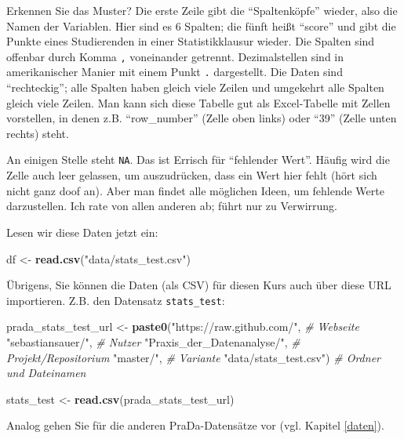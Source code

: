 \documentclass[12pt,ngerman,]{book}
\makeatletter
\newenvironment{Shaded}{\begin{snugshade}}{\end{snugshade}}
\newcommand{\KeywordTok}[1]{\textcolor[rgb]{0.13,0.29,0.53}{\textbf{#1}}}
\newcommand{\StringTok}[1]{\textcolor[rgb]{0.31,0.60,0.02}{#1}}
\newcommand{\CommentTok}[1]{\textcolor[rgb]{0.56,0.35,0.01}{\textit{#1}}}
\newcommand{\NormalTok}[1]{#1}
\newenvironment{kframe}{%
\medskip{}
\setlength{\fboxsep}{.8em}
 \def\at@end@of@kframe{}%
 \ifinner\ifhmode%
  \def\at@end@of@kframe{\end{minipage}}%
  \begin{minipage}{\columnwidth}%
 \fi\fi%
 \def\FrameCommand##1{\hskip\@totalleftmargin \hskip-\fboxsep
 \colorbox{shadecolor}{##1}\hskip-\fboxsep
     \hskip-\linewidth \hskip-\@totalleftmargin \hskip\columnwidth}%
 \MakeFramed {\advance\hsize-\width
   \@totalleftmargin\z@ \linewidth\hsize
   \@setminipage}}%
 {\par\unskip\endMakeFramed%
 \at@end@of@kframe}
\renewenvironment{Shaded}{\begin{kframe}}{\end{kframe}}
\theoremstyle{definition}
\theoremstyle{definition}
\theoremstyle{remark}
\makeatother
\begin{document}
Erkennen Sie das Muster? Die erste Zeile gibt die ``Spaltenköpfe''
wieder, also die Namen der Variablen. Hier sind es 6 Spalten; die fünft
heißt ``score'' und gibt die Punkte eines Studierenden in einer
Statistikklausur wieder. Die Spalten sind offenbar durch Komma
\texttt{,} voneinander getrennt. Dezimalstellen sind in amerikanischer
Manier mit einem Punkt \texttt{.} dargestellt. Die Daten sind
``rechteckig''; alle Spalten haben gleich viele Zeilen und umgekehrt
alle Spalten gleich viele Zeilen. Man kann sich diese Tabelle gut als
Excel-Tabelle mit Zellen vorstellen, in denen z.B. ``row\_number''
(Zelle oben links) oder ``39'' (Zelle unten rechts) steht.

An einigen Stelle steht \texttt{NA}. Das ist Errisch für ``fehlender
Wert''. Häufig wird die Zelle auch leer gelassen, um auszudrücken, dass
ein Wert hier fehlt (hört sich nicht ganz doof an). Aber man findet alle
möglichen Ideen, um fehlende Werte darzustellen. Ich rate von allen
anderen ab; führt nur zu Verwirrung.

Lesen wir diese Daten jetzt ein:

\begin{Shaded}
\begin{Highlighting}[]
\NormalTok{df <-}\StringTok{ }\KeywordTok{read.csv}\NormalTok{(}\StringTok{"data/stats_test.csv"}\NormalTok{)}
\end{Highlighting}
\end{Shaded}

Übrigens, Sie können die Daten (als CSV) für diesen Kurs auch über diese
URL importieren. Z.B. den Datensatz \texttt{stats\_test}:

\begin{Shaded}
\begin{Highlighting}[]
\NormalTok{prada_stats_test_url <-}
\StringTok{  }\KeywordTok{paste0}\NormalTok{(}\StringTok{"https://raw.github.com/"}\NormalTok{,  }\CommentTok{# Webseite}
         \StringTok{"sebastiansauer/"}\NormalTok{,  }\CommentTok{# Nutzer}
         \StringTok{"Praxis_der_Datenanalyse/"}\NormalTok{,  }\CommentTok{# Projekt/Repositorium}
         \StringTok{"master/"}\NormalTok{,  }\CommentTok{# Variante}
         \StringTok{"data/stats_test.csv"}\NormalTok{)  }\CommentTok{# Ordner und Dateinamen}

\NormalTok{stats_test <-}\StringTok{ }\KeywordTok{read.csv}\NormalTok{(prada_stats_test_url)}
\end{Highlighting}
\end{Shaded}

Analog gehen Sie für die anderen PraDa-Datensätze vor (vgl. Kapitel
\ref{daten}).
\end{document}
